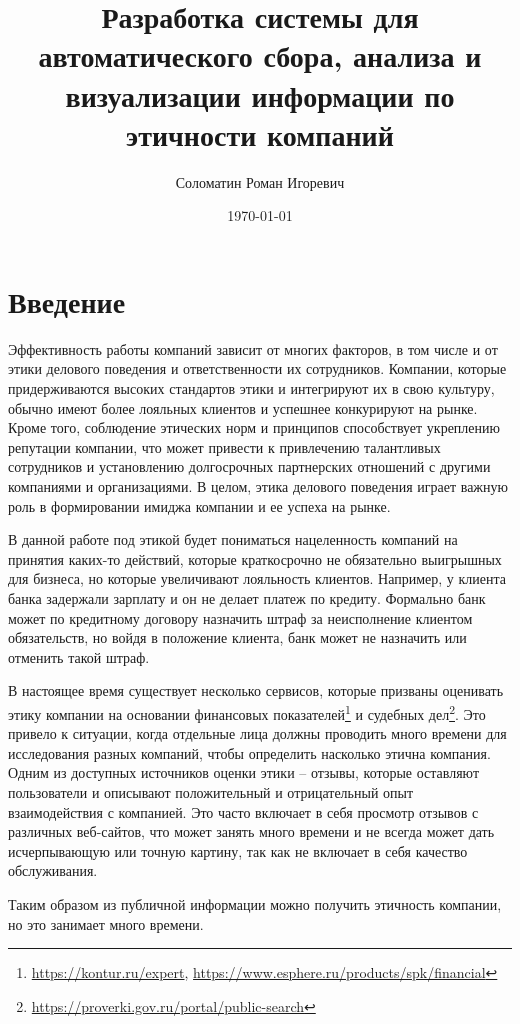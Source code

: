 \documentclass[PI, VKR]{HSEUniversity}
\author{Соломатин Роман Игоревич}
\date{\today}
\title{Разработка системы для автоматического сбора, анализа и визуализации информации по этичности компаний}
\begin{document}
\maketitle

\chapter*{Введение}
\label{sec:org3663051}
Эффективность работы компаний зависит от многих факторов, в том числе и от этики делового поведения и ответственности их сотрудников. Компании, которые придерживаются высоких стандартов этики и интегрируют их в свою культуру, обычно имеют более лояльных клиентов и успешнее конкурируют на рынке\autocite{mure_esg_2021}. Кроме того, соблюдение этических норм и принципов способствует укреплению репутации компании, что может привести к привлечению талантливых сотрудников и установлению долгосрочных партнерских отношений с другими компаниями и организациями. В целом, этика делового поведения играет важную роль в формировании имиджа компании и ее успеха на рынке.

В данной работе под этикой будет пониматься нацеленность компаний на принятия каких-то действий, которые краткосрочно не обязательно выигрышных для бизнеса, но которые увеличивают лояльность клиентов. Например, у клиента банка задержали зарплату и он не делает платеж по кредиту. Формально банк может по кредитному договору назначить штраф за неисполнение клиентом обязательств, но войдя в положение клиента, банк может не назначить или отменить такой штраф.

В настоящее время существует несколько сервисов, которые призваны оценивать этику компании на основании финансовых показателей\footnote{\url{https://kontur.ru/expert}, \url{https://www.esphere.ru/products/spk/financial}} и судебных дел\footnote{\url{https://proverki.gov.ru/portal/public-search}}. Это привело к ситуации, когда отдельные лица должны проводить много времени для исследования разных компаний, чтобы определить насколько этична компания. Одним из доступных источников оценки этики -- отзывы, которые оставляют пользователи и описывают положительный и отрицательный опыт взаимодействия с компанией. Это часто включает в себя просмотр отзывов с различных веб-сайтов, что может занять много времени и не всегда может дать исчерпывающую или точную картину, так как не включает в себя качество обслуживания.

Таким образом из публичной информации можно получить этичность компании, но это занимает много времени.
\end{document}
